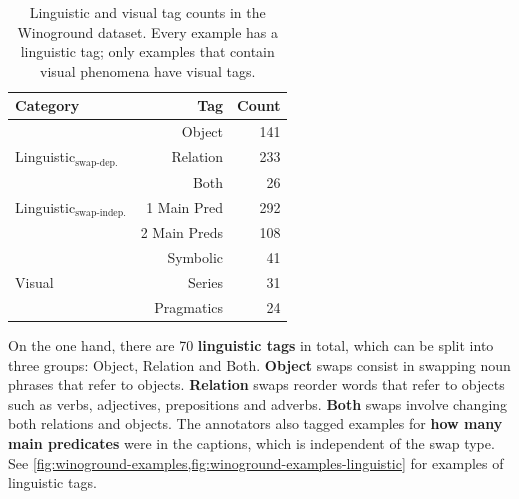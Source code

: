 \begin{table}[ht]
\centering
\begin{tabular}{lrr}
\toprule
 Category & Tag    &   Count \\
\midrule
 & Object   &     141 \\
 Linguistic$_\text{swap-dep.}$ & Relation &     233 \\
 & Both &      26 \\\midrule
 Linguistic$_\text{swap-indep.}$ & 1 Main Pred & 292 \\
 & 2 Main Preds & 108 \\\midrule
 & Symbolic &  41 \\
 Visual & Series &  31 \\
 & Pragmatics &  24\\
\bottomrule
\end{tabular}
\caption{Linguistic and visual tag counts in the Winoground dataset. Every example has a linguistic tag; only examples that contain visual phenomena have visual tags.}
\label{tab:stats-tag-subset}
\end{table}

On the one hand, there are 70 \textbf{linguistic tags} in total, which can be split into three groups: Object, Relation and Both. \textbf{Object} swaps consist in swapping noun phrases that refer to objects. \textbf{Relation} swaps reorder words that refer to objects such as verbs, adjectives, prepositions and adverbs. \textbf{Both} swaps involve changing both relations and objects. The annotators also tagged examples for \textbf{how many main predicates} were in the captions, which is independent of the swap type. See \cref{fig:winoground-examples,fig:winoground-examples-linguistic} for examples of linguistic tags.

